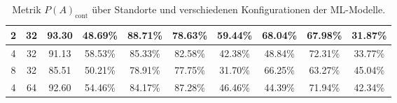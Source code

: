 \begin{table}[h!]
\begin{tabular}{ | c | c | c | c | c | c | c | c | c | c | }
        2 & 32 & 93.30 & 48.69\% & 88.71\% & 78.63\% & 59.44\% & 68.04\% & 67.98\% & 31.87\% \\\hline
        4 & 32 & 91.13 & 58.53\% & 85.33\% & 82.58\% & 42.38\% & 48.84\% & 72.31\% & 33.77\% \\\hline
        8 & 32 & 85.51 & 50.21\% & 78.91\% & 77.75\% & 31.70\% & 66.25\% & 63.27\% & 45.04\% \\\hline
        4 & 64 & 92.60 & 54.46\% & 84.17\% & 87.28\% & 46.46\% & 44.39\% & 71.94\% & 42.34\% \\\hline
    \end{tabular}
    \caption{Metrik $P(A)_{\text{cont}}$ über Standorte und verschiedenen Konfigurationen der ML-Modelle.}
    \label{tab:predictions_by_acc_cont}
\end{table}

